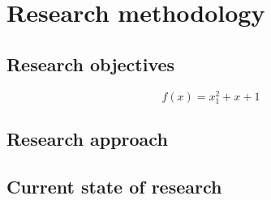 \chapter{Research methodology}

\section{Research objectives}

\begin{equation}
\label{eq_the_method}
    f(x) = x_1^2 + x + 1
\end{equation}

\cite{dlib09,dedrick2006scope,henkel2006revealingemblinux,fitzgerald2003trencheslessons}

\section{Research approach}

\section{Current state of research}
